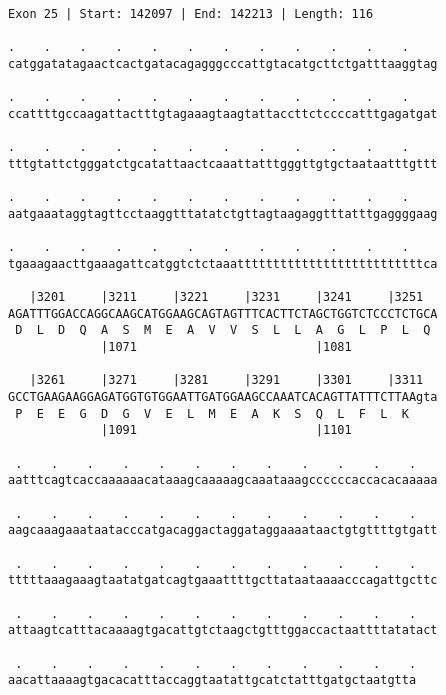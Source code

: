 \documentclass{article}
\begin{document}
\begin{Verbatim}
Exon 25 | Start: 142097 | End: 142213 | Length: 116
 
.    .    .    .    .    .    .    .    .    .    .    .    
catggatatagaactcactgatacagagggcccattgtacatgcttctgatttaaggtag
  
.    .    .    .    .    .    .    .    .    .    .    .    
ccattttgccaagattactttgtagaaagtaagtattaccttctccccatttgagatgat
  
.    .    .    .    .    .    .    .    .    .    .    .    
tttgtattctgggatctgcatattaactcaaattatttgggttgtgctaataatttgttt
  
.    .    .    .    .    .    .    .    .    .    .    .    
aatgaaataggtagttcctaaggtttatatctgttagtaagaggtttatttgaggggaag
  
.    .    .    .    .    .    .    .    .    .    .    .    
tgaaagaacttgaaagattcatggtctctaaattttttttttttttttttttttttttca
  
   |3201     |3211     |3221     |3231     |3241     |3251  
AGATTTGGACCAGGCAAGCATGGAAGCAGTAGTTTCACTTCTAGCTGGTCTCCCTCTGCA
 D  L  D  Q  A  S  M  E  A  V  V  S  L  L  A  G  L  P  L  Q 
             |1071                         |1081            
  
   |3261     |3271     |3281     |3291     |3301     |3311  
GCCTGAAGAAGGAGATGGTGTGGAATTGATGGAAGCCAAATCACAGTTATTTCTTAAgta
 P  E  E  G  D  G  V  E  L  M  E  A  K  S  Q  L  F  L  K    
             |1091                         |1101            
  
 .    .    .    .    .    .    .    .    .    .    .    .   
aatttcagtcaccaaaaaacataaagcaaaaagcaaataaagccccccaccacacaaaaa
  
 .    .    .    .    .    .    .    .    .    .    .    .   
aagcaaagaaataatacccatgacaggactaggataggaaaataactgtgttttgtgatt
  
 .    .    .    .    .    .    .    .    .    .    .    .   
tttttaaagaaagtaatatgatcagtgaaattttgcttataataaaacccagattgcttc
  
 .    .    .    .    .    .    .    .    .    .    .    .   
attaagtcatttacaaaagtgacattgtctaagctgtttggaccactaattttatatact
  
 .    .    .    .    .    .    .    .    .    .    .    .
aacattaaaagtgacacatttaccaggtaatattgcatctatttgatgctaatgtta
\end{Verbatim}
\newpage
\end{document}
